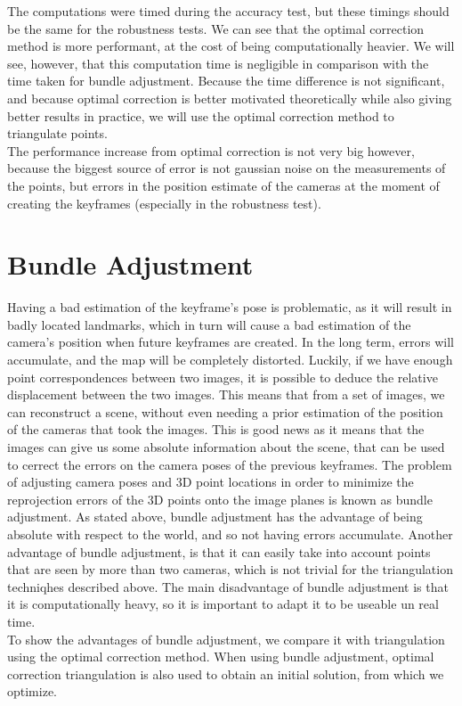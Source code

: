 The computations were timed during the accuracy test, but these timings should be the same for the robustness tests. %
We can see that the optimal correction method is more performant, at the cost of being computationally heavier. We will see, however, that this computation time is negligible in comparison with the time taken for bundle adjustment. Because the time difference is not significant, and because optimal correction is better motivated theoretically while also giving better results in practice, we will use the optimal correction method to triangulate points.\\
The performance increase from optimal correction is not very big however, because the biggest source of error is not gaussian noise on the measurements of the points, but errors in the position estimate of the cameras at the moment of creating the keyframes (especially in the robustness test).

\section{Bundle Adjustment}
Having a bad estimation of the keyframe's pose is problematic, as it will result in badly located landmarks, which in turn will cause a bad estimation of the camera's position when future keyframes are created. In the long term, errors will accumulate, and the map will be completely distorted. Luckily, if we have enough point correspondences between two images, it is possible to deduce the relative displacement between the two images. This means that from a set of images, we can reconstruct a scene, without even needing a prior estimation of the position of the cameras that took the images. This is good news as it means that the images can give us some absolute information about the scene, that can be used to cerrect the errors on the camera poses of the previous keyframes. The problem of adjusting camera poses and 3D point locations in order to minimize the reprojection errors of the 3D points onto the image planes is known as bundle adjustment. As stated above, bundle adjustment has the advantage of being absolute with respect to the world, and so not having errors accumulate. Another advantage of bundle adjustment, is that it can easily take into account points that are seen by more than two cameras, which is not trivial for the triangulation techniqhes described above. The main disadvantage of bundle adjustment is that it is computationally heavy, so it is important to adapt it to be useable un real time.\\
To show the advantages of bundle adjustment, we compare it with triangulation using the optimal correction method. When using bundle adjustment, optimal correction triangulation is also used to obtain an initial solution, from which we optimize.
